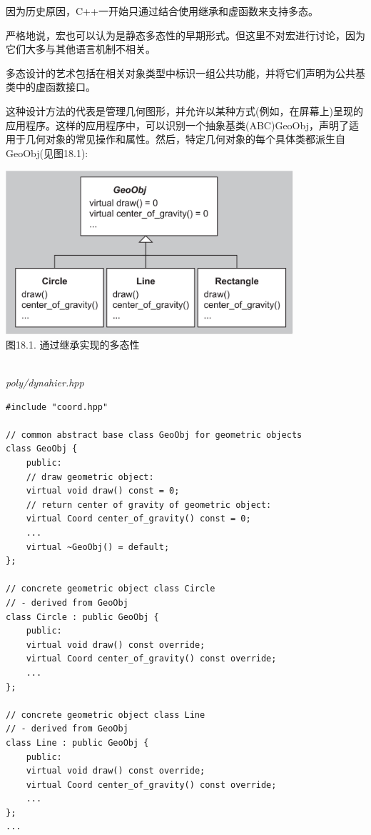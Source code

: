 
因为历史原因，C++一开始只通过结合使用继承和虚函数来支持多态。

\begin{tcolorbox}[colback=webgreen!5!white,colframe=webgreen!75!black]
\hspace*{0.75cm}严格地说，宏也可以认为是静态多态性的早期形式。但这里不对宏进行讨论，因为它们大多与其他语言机制不相关。
\end{tcolorbox}

多态设计的艺术包括在相关对象类型中标识一组公共功能，并将它们声明为公共基类中的虚函数接口。

这种设计方法的代表是管理几何图形，并允许以某种方式(例如，在屏幕上)呈现的应用程序。这样的应用程序中，可以识别一个抽象基类(ABC)GeoObj，声明了适用于几何对象的常见操作和属性。然后，特定几何对象的每个具体类都派生自GeoObj(见图18.1):

\begin{center}
\includegraphics[width=0.8\textwidth]{content/3/chapter18/images/1.png} \\
图18.1. 通过继承实现的多态性
\end{center}

\hspace*{\fill} \\ %
\noindent
\textit{poly/dynahier.hpp}
\begin{lstlisting}[style=styleCXX]
#include "coord.hpp"

// common abstract base class GeoObj for geometric objects
class GeoObj {
	public:
	// draw geometric object:
	virtual void draw() const = 0;
	// return center of gravity of geometric object:
	virtual Coord center_of_gravity() const = 0;
	...
	virtual ~GeoObj() = default;
};

// concrete geometric object class Circle
// - derived from GeoObj
class Circle : public GeoObj {
	public:
	virtual void draw() const override;
	virtual Coord center_of_gravity() const override;
	...
};

// concrete geometric object class Line
// - derived from GeoObj
class Line : public GeoObj {
	public:
	virtual void draw() const override;
	virtual Coord center_of_gravity() const override;
	...
};
...
\end{lstlisting}


